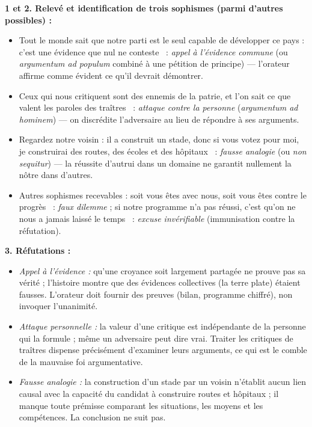 \documentclass[11pt]{article}
\begin{document}
\begin{corrige}
\textbf{1 et 2. Relevé et identification de trois sophismes (parmi d'autres possibles) :}

\begin{itemize}
\item \guillemotleft Tout le monde sait que notre parti est le seul capable de développer ce pays : c'est une évidence que nul ne conteste \guillemotright\ : \emph{appel à l'évidence commune} (ou \emph{argumentum ad populum} combiné à une pétition de principe) --- l'orateur affirme comme évident ce qu'il devrait démontrer.
\item \guillemotleft Ceux qui nous critiquent sont des ennemis de la patrie, et l'on sait ce que valent les paroles des traîtres \guillemotright\ : \emph{attaque contre la personne} (\emph{argumentum ad hominem}) --- on discrédite l'adversaire au lieu de répondre à ses arguments.
\item \guillemotleft Regardez notre voisin : il a construit un stade, donc si vous votez pour moi, je construirai des routes, des écoles et des hôpitaux \guillemotright\ : \emph{fausse analogie} (ou \emph{non sequitur}) --- la réussite d'autrui dans un domaine ne garantit nullement la nôtre dans d'autres.
\item Autres sophismes recevables : \guillemotleft soit vous êtes avec nous, soit vous êtes contre le progrès \guillemotright\ : \emph{faux dilemme} ; \guillemotleft si notre programme n'a pas réussi, c'est qu'on ne nous a jamais laissé le temps \guillemotright\ : \emph{excuse invérifiable} (immunisation contre la réfutation).
\end{itemize}

\textbf{3. Réfutations :}
\begin{itemize}
\item \emph{Appel à l'évidence :} qu'une croyance soit largement partagée ne prouve pas sa vérité ; l'histoire montre que des évidences collectives (la terre plate) étaient fausses. L'orateur doit fournir des preuves (bilan, programme chiffré), non invoquer l'unanimité.
\item \emph{Attaque personnelle :} la valeur d'une critique est indépendante de la personne qui la formule ; même un adversaire peut dire vrai. Traiter les critiques de traîtres dispense précisément d'examiner leurs arguments, ce qui est le comble de la mauvaise foi argumentative.
\item \emph{Fausse analogie :} la construction d'un stade par un voisin n'établit aucun lien causal avec la capacité du candidat à construire routes et hôpitaux ; il manque toute prémisse comparant les situations, les moyens et les compétences. La conclusion ne suit pas.
\end{itemize}


\end{corrige}
\end{document}
